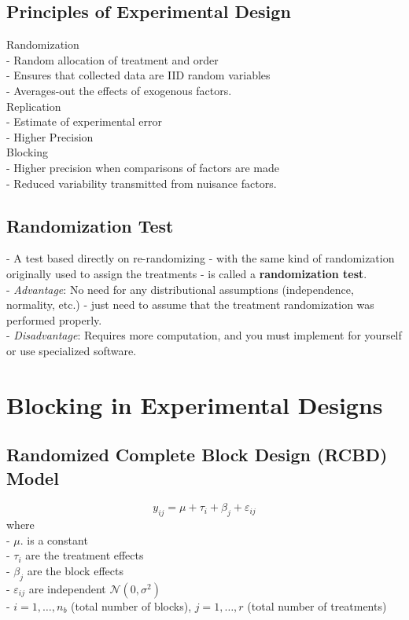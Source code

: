 \documentclass[11pt,a4paper]{article}
\begin{document}
\subsection{ Principles of Experimental Design}
Randomization\\
- Random allocation of treatment and order\\
- Ensures that collected data are IID random variables\\
- Averages-out the effects of exogenous factors.\\

Replication\\
- Estimate of experimental error\\
- Higher Precision\\

Blocking\\
- Higher precision when comparisons of factors are made\\
- Reduced variability transmitted from nuisance factors.\\


\subsection{ Randomization Test}
- A test based directly on re-randomizing - with the same kind of randomization originally used to assign the treatments - is called a \textbf{randomization test}.\\

- \textit{Advantage}: No need for any distributional assumptions (independence, normality, etc.) - just need to assume that the treatment randomization was performed properly.\\
- \textit{Disadvantage}: Requires more computation, and you must implement for yourself or use specialized software.

\section{ Blocking in Experimental Designs}
\subsection{ Randomized Complete Block Design (RCBD) Model}
$$
y_{i j}=\mu+\tau_{i}+\beta_{j}+\varepsilon_{i j}
$$
where\\
- $\mu .$ is a constant\\
- $\tau_{i}$ are the treatment effects\\
- $\beta_{j}$ are the block effects\\
- $\varepsilon_{i j}$ are independent $\mathcal{N}\left(0, \sigma^{2}\right)$\\
- $i=1, \ldots, n_{b}$ (total number of blocks), $j=1, \ldots, r$ (total number of treatments)\\
\end{document}
